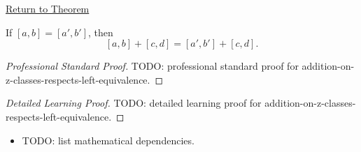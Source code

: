 \newpage
{}
\label{prf:addition-on-z-classes-respects-left-equivalence}

\begin{remark*}[Return]
\hyperref[lem:addition-on-z-classes-respects-left-equivalence]{Return to Theorem}
\end{remark*}

\begin{lemma*}
If $[a,b]=[a',b']$, then
\[
[a,b]+[c,d]=[a',b']+[c,d].
\]
\end{lemma*}

\begin{proof}[Professional Standard Proof]
\LRAProofBodyStart
TODO: professional standard proof for addition-on-z-classes-respects-left-equivalence.
\end{proof}

\begin{proof}[Detailed Learning Proof]
\LRAProofBodyStart
TODO: detailed learning proof for addition-on-z-classes-respects-left-equivalence.
\end{proof}

\begin{remark*}
\end{remark*}

\begin{dependencies}
\begin{itemize}
  \item TODO: list mathematical dependencies.
\end{itemize}
\end{dependencies}

\clearpage
